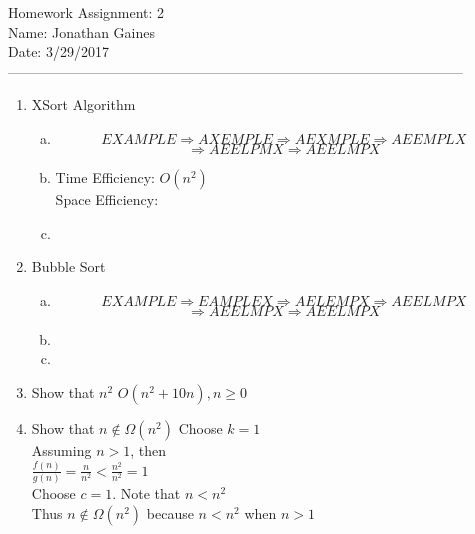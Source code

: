 \documentclass[12pt]{article}
\begin{document}
Homework Assignment: 2\\ 
Name: Jonathan Gaines\\ 
Date: 3/29/2017\\ --------------------------------------------------------------------------------------------------
\begin {enumerate}
\item XSort Algorithm
	\begin {enumerate}[(a)]
		\item
		$$EXAMPLE\Rightarrow 
			AXEMPLE\Rightarrow	
			AEXMPLE\Rightarrow
			AEEMPLX$$ $$\Rightarrow 
		  AEELPMX\Rightarrow
			AEELMPX $$		
		\item
			Time Efficiency: $O(n^{2})$ \\
			Space Efficiency: 
		\item 
	\end {enumerate}
\item Bubble Sort
	\begin {enumerate}[(a)]
		\item
		$$EXAMPLE\Rightarrow 
			EAMPLEX\Rightarrow	
			AELEMPX\Rightarrow
			AEELMPX$$ $$\Rightarrow
			AEELMPX\Rightarrow
			AEELMPX $$
		\item
		\item
	\end {enumerate}
\item Show that $n^{2}$ \in $O(n^{2}+10n), n \geq 0$

\item Show that $n \not\in \Omega(n^{2})$
	Choose $k=1$ \\
	Assuming $n > 1$, then \\
	$\frac{f(n)}{g(n)} = \frac{n}{n^{2}} < \frac{n^{2}}{n^{2}} = 1$ \\
	Choose $c=1$. Note that $n < n^{2}$ \\
	Thus $n \not\in \Omega(n^{2})$ because $n<n^{2}$ when $n>1$
\end {enumerate}
\end{document}
